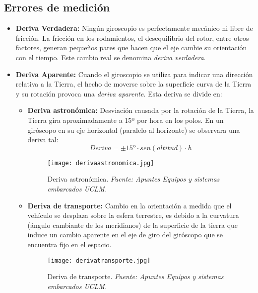  \subsection{Errores de medición}
\label{subsec:erroresdemedicion}
\begin{itemize}
    \item \textbf{Deriva Verdadera:}  
    Ningún giroscopio es perfectamente mecánico ni libre de fricción. La fricción en los rodamientos, el desequilibrio del rotor, entre otros factores, generan pequeños pares que hacen que el eje cambie su orientación con el tiempo. Este cambio real se denomina \emph{deriva verdadera}.
    
    \item \textbf{Deriva Aparente:}  
    Cuando el giroscopio se utiliza para indicar una dirección relativa a la Tierra, el hecho de moverse sobre la superficie curva de la Tierra y su rotación provoca una \emph{deriva aparente}. Esta deriva se divide en:

	\begin{itemize}
        		\item \textbf{Deriva astronómica:} Desviación causada por la rotación de la Tierra, la Tierra gira aproximadamente a 15º por hora en los polos. En un giróscopo en su eje horizontal (paralelo al horizonte) se observara una deriva tal:
		\begin{equation}
			Deriva = \pm 15º \cdot sen(altitud) \cdot h
		\end{equation}

		 \begin{figure}[H]
		  	\centering
		    	\texttt{[image: derivaastronomica.jpg]}
		    	\caption{\centering Deriva astronómica.\textit{ Fuente: Apuntes Equipos y sistemas embarcados UCLM.}}
			\label{fig:placeholder}
		\end{figure}      
        
 	       \item \textbf{Deriva de transporte:} Cambio en la orientación a medida que el vehículo se desplaza sobre la esfera terrestre, es debido a la curvatura (ángulo cambiante de los meridianos) de la superficie de la tierra que induce un cambio aparente en el eje de giro del giróscopo que se encuentra fijo en el espacio.
        
		\begin{figure}[H]
		    \centering
		    \texttt{[image: derivatransporte.jpg]}
		    \caption{\centering Deriva de transporte.\textit{ Fuente: Apuntes Equipos y sistemas embarcados UCLM.}}
		    \label{fig:placeholder}
		\end{figure}           
        
	\end{itemize}
\end{itemize}


